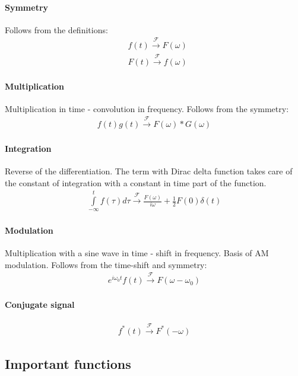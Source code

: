 \documentclass{article}
\begin{document}
\paragraph{Symmetry} Follows from the definitions:
\begin{align*}
    &f(t) \xrightarrow{\mathcal{F}} F(\omega) \\
    &F(t) \xrightarrow{\mathcal{F}} f(\omega)
\end{align*}

\paragraph{Multiplication} Multiplication in time - convolution in frequency. Follows from the symmetry:
\begin{align*}
    f(t)g(t) \xrightarrow{\mathcal{F}} F(\omega) * G(\omega)
\end{align*}

\paragraph{Integration} Reverse of the differentiation. 
The term with Dirac delta function takes care of the constant of integration with a constant in time part of the function.
\begin{align*}
    \int \limits^{t}_{-\infty}f(\tau)d \tau \xrightarrow{\mathcal{F}} \frac{F(\omega)}{i \omega} + \frac{1}{2}F(0)\delta(t)
\end{align*}

\paragraph{Modulation} Multiplication with a sine wave in time - shift in frequency. Basis of AM modulation.
Follows from the time-shift and symmetry:
\begin{align*}
    e^{i \omega_0 t}f(t) \xrightarrow{\mathcal{F}} F(\omega - \omega_0)
\end{align*}

\paragraph{Conjugate signal}
\begin{align*}
   f^*(t) \xrightarrow{\mathcal{F}} F^{*}(-\omega)
\end{align*}

\subsection{Important functions}
\end{document}
